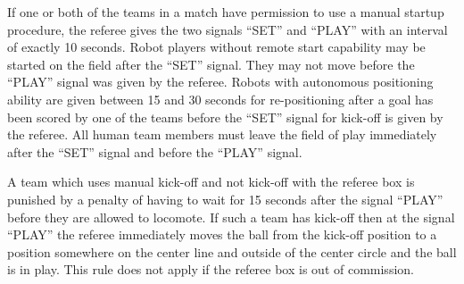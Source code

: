 \bigskip

If one or both of the teams in a match have permission to use a manual startup procedure, the referee gives the two signals ``SET'' and ``PLAY'' with an interval of exactly
10 seconds. Robot players without remote start capability may be started on the field after the ``SET'' signal. They may not move before the ``PLAY'' signal was given
by the referee. Robots with autonomous positioning ability are given between 15 and 30 seconds for re-positioning after a goal has been scored by one of the teams before the ``SET'' signal for kick-off is given by the referee. All human team members must leave the field of play
immediately after the ``SET'' signal and before the ``PLAY'' signal.

A team which uses manual kick-off and not kick-off with the referee box is punished by a penalty of having to wait for 15 seconds after the signal ``PLAY'' before they are
allowed to locomote. If such a team has kick-off then at the signal ``PLAY'' the referee immediately moves the ball from the kick-off position to a position somewhere on
the center line and outside of the center circle and the ball is in play. This rule does not apply if the referee box is out of commission.

\bigskip

\color{black}

